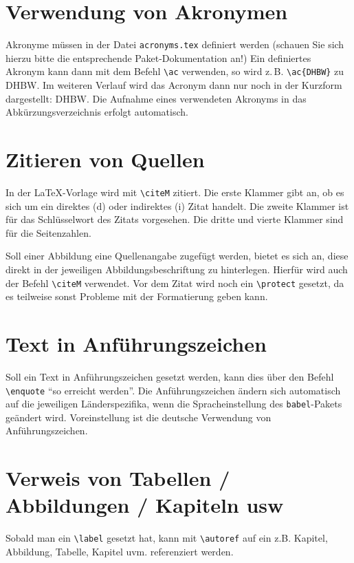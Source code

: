 \section{Verwendung von Akronymen}
Akronyme müssen in der Datei \texttt{acronyms.tex} definiert werden (schauen Sie sich hierzu bitte die entsprechende Paket-Dokumentation an!)
Ein definiertes Akronym kann dann mit dem Befehl \texttt{\textbackslash ac} verwenden, so wird z.\,B. \texttt{\textbackslash ac\{DHBW\}} zu \ac{DHBW}. Im weiteren Verlauf wird das 
Acronym dann nur noch in der Kurzform dargestellt: \ac{DHBW}. Die Aufnahme eines verwendeten Akronyms in das Abkürzungsverzeichnis erfolgt automatisch.

\section{Zitieren von Quellen}
In  der LaTeX-Vorlage wird mit \texttt{\textbackslash citeM{}{}{}{}} zitiert. Die erste Klammer gibt an, ob es sich um ein direktes (d) oder indirektes (i) Zitat handelt. Die zweite Klammer ist für das Schlüsselwort des Zitats vorgesehen. Die dritte und vierte Klammer sind für die Seitenzahlen.


Soll einer Abbildung eine Quellenangabe zugefügt werden, bietet es sich an, diese direkt in der jeweiligen Abbildungsbeschriftung zu hinterlegen. Hierfür wird auch der Befehl \texttt{\textbackslash citeM} verwendet. Vor dem Zitat wird noch ein \texttt{\textbackslash protect} gesetzt, da es teilweise sonst Probleme mit der Formatierung geben kann.


\section{Text in Anführungszeichen}
Soll ein Text in Anführungszeichen gesetzt werden, kann dies über den Befehl \texttt{\textbackslash enquote} \enquote{so erreicht werden}. Die Anführungszeichen ändern sich automatisch auf die 
jeweiligen Länderspezifika, wenn die Spracheinstellung des \texttt{babel}-Pakets geändert wird. Voreinstellung ist die deutsche Verwendung von 
Anführungszeichen.

\section{Verweis von Tabellen / Abbildungen / Kapiteln usw}

 Sobald man ein \texttt{\textbackslash label} gesetzt hat, kann mit \texttt{\textbackslash autoref} auf ein z.B. Kapitel, Abbildung, Tabelle, Kapitel uvm. referenziert werden.




